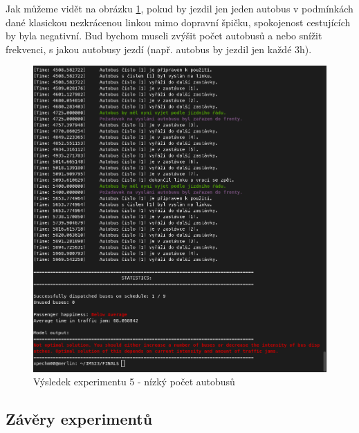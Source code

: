 \documentclass[a4paper]{article}
\begin{document}
            Jak můžeme vidět na obrázku \ref{fig:experiment5}, pokud by jezdil jen jeden autobus v podmínkách dané klasickou nezkrácenou linkou mimo dopravní špičku, spokojenost cestujících by byla negativní. Bud bychom museli zvýšit počet autobusů a nebo snížit frekvenci, s jakou autobusy jezdí (např. autobus by jezdil jen každé 3h).
                
                \begin{figure}[H]
                \includegraphics[scale=0.37, keepaspectratio]{fig/ims_bus5.png}
                \caption{Výsledek experimentu 5 - nízký počet autobusů}
                \label{fig:experiment5}
            \end{figure}

        \subsection{Závěry experimentů}
        \label{subsec:experiments_summary}
\end{document}
